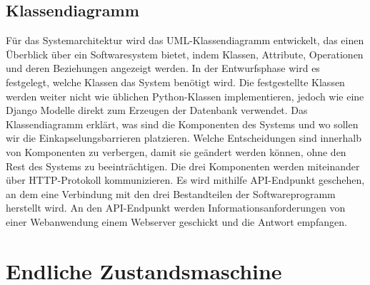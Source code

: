 \subsection{Klassendiagramm}
\label{sec:design:uml:class}
Für das Systemarchitektur wird das UML-Klassendiagramm entwickelt, das einen Überblick über ein Softwaresystem bietet, indem Klassen, Attribute, Operationen und deren Beziehungen angezeigt werden\cite{website:19}. In der Entwurfsphase wird es festgelegt, welche Klassen das System benötigt wird. Die festgestellte Klassen werden weiter nicht wie üblichen Python-Klassen implementieren, jedoch wie eine Django Modelle direkt zum Erzeugen der Datenbank verwendet. Das Klassendiagramm erklärt, was sind die Komponenten des Systems und wo sollen wir die Einkapselungsbarrieren platzieren. Welche Entscheidungen sind innerhalb von Komponenten zu verbergen, damit sie geändert werden können, ohne den Rest des Systems zu beeinträchtigen. Die drei Komponenten werden miteinander über HTTP-Protokoll kommunizieren. Es wird mithilfe API-Endpunkt geschehen, an dem eine Verbindung mit den drei Bestandteilen der Softwareprogramm herstellt wird. An den API-Endpunkt werden Informationsanforderungen von einer Webanwendung einem Webserver geschickt und die Antwort empfangen.

\section{Endliche Zustandsmaschine}
\label{sec:design:fsm}

